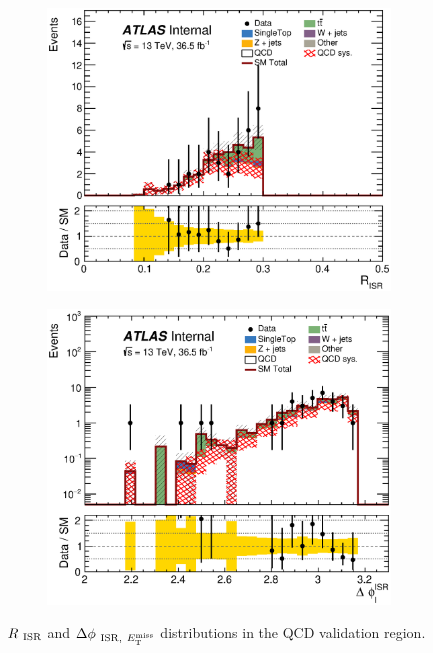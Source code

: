 \begin{figure}[!h]
\begin{center}
    \begin{subfigure}[b]{0.40\textwidth}  
    \includegraphics[width=\textwidth]{figures/QCDJetSmearing/VRqC/RISR_36500} 
                \caption{ }
    \end{subfigure}
    \begin{subfigure}[b]{0.40\textwidth}  
    \includegraphics[width=\textwidth]{figures/QCDJetSmearing/VRqC/dphiISRI_36500.eps}
                \caption{ }
    \end{subfigure}
\caption[$\RISR$ and $\dphiISRI$ distributions in the QCD validation regions]{$\RISR$ and $\dphiISRI$ distributions in the QCD validation region.}
\label{fig:QCD:VR}
\end{center}
\end{figure}

